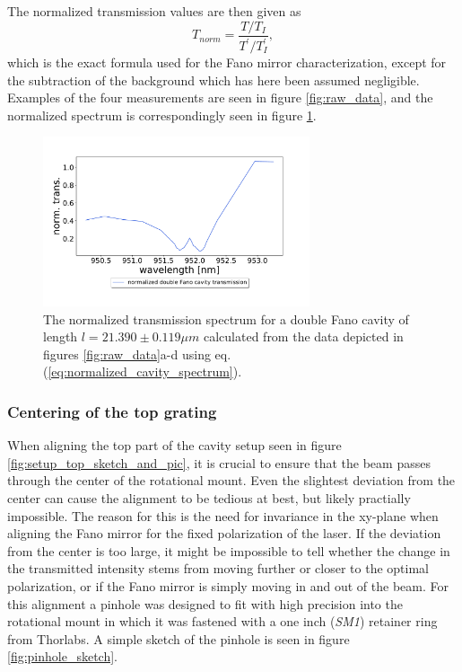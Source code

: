The normalized transmission values are then given as
\begin{equation}
    T_{norm} = \frac{T/T_I}{T^{\prime}/T_I^{\prime}},
    \label{eq:normalized_cavity_spectrum}
\end{equation}
which is the exact formula used for the Fano mirror characterization, except for the subtraction of the background which has here been assumed negligible. Examples of the four measurements are seen in figure \ref{fig:raw_data}, and the normalized spectrum is correspondingly seen in figure \ref{fig:raw_data_normalized_transmission}.

\begin{figure}[h!]
    \centering
    \includegraphics[width=0.7\textwidth]{figures/raw_data_normalized_transmission.pdf}
    \caption{The normalized transmission spectrum for a double Fano cavity of length $l=21.390 \pm 0.119 \mu m$ calculated from the data depicted in figures \ref{fig:raw_data}a-d using eq. (\ref{eq:normalized_cavity_spectrum}).}
    \label{fig:raw_data_normalized_transmission}
\end{figure}

\subsubsection{Centering of the top grating}\label{sec:pinhole_method}

When aligning the top part of the cavity setup seen in figure \ref{fig:setup_top_sketch_and_pic}, it is crucial to ensure that the beam passes through the center of the rotational mount. Even the slightest deviation from the center can cause the alignment to be tedious at best, but likely practially impossible. The reason for this is the need for invariance in the xy-plane when aligning the Fano mirror for the fixed polarization of the laser. If the deviation from the center is too large, it might be impossible to tell whether the change in the transmitted intensity stems from moving further or closer to the optimal polarization, or if the Fano mirror is simply moving in and out of the beam. For this alignment a pinhole was designed to fit with high precision into the rotational mount in which it was fastened with a one inch (\emph{SM1}) retainer ring from Thorlabs. A simple sketch of the pinhole is seen in figure \ref{fig:pinhole_sketch}.

